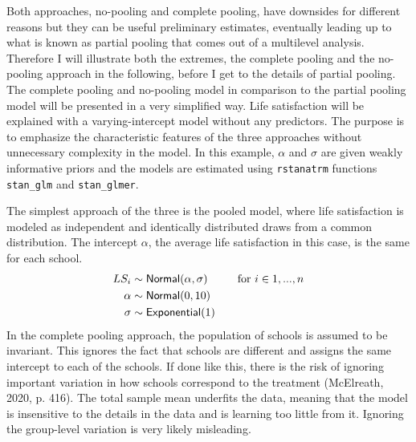 \documentclass[a4, 12pt]{article}
\begin{document}
Both approaches, no-pooling and complete pooling, have downsides for different reasons but they can be useful preliminary estimates, eventually leading up to what is known as partial pooling that comes out of a multilevel analysis. Therefore I will illustrate both the extremes, the complete pooling and the no-pooling approach in the following, before I get to the details of partial pooling. The complete pooling and no-pooling model in comparison to the partial pooling model will be presented in a very simplified way. Life satisfaction will be explained with a varying-intercept model without any predictors. The purpose is to emphasize the characteristic features of the three approaches without unnecessary complexity in the model. In this example, \(\alpha\) and \(\sigma\) are given weakly informative priors and the models are estimated using \texttt{rstanatrm} functions \texttt{stan\_glm} and \texttt{stan\_glmer}.

The simplest approach of the three is the pooled model, where life satisfaction is modeled as independent and identically distributed draws from a common distribution. The intercept \(\alpha\), the average life satisfaction in this case, is the same for each school.
\begin{align*}
LS_i & \sim {\sf {Normal}} (\alpha, \sigma) & \quad \text{for } i \in 1,...,n \\
\alpha & \sim {\sf Normal} (0, 10) \\
\sigma & \sim {\sf Exponential} (1)
\end{align*}
In the complete pooling approach, the population of schools is assumed to be invariant. This ignores the fact that schools are different and assigns the same intercept to each of the schools. If done like this, there is the risk of ignoring important variation in how schools correspond to the treatment (McElreath, 2020, p. 416). The total sample mean underfits the data, meaning that the model is insensitive to the details in the data and is learning too little from it. Ignoring the group-level variation is very likely misleading.
\end{document}
